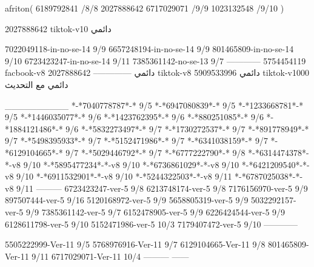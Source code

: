 afriton(
6189792841 /8/8
2027888642
6717029071 /9/9
1023132548 /9/10
)

2027888642 tiktok-v10
دائمي

7022049118-in-no-se-14 9/9
6657248194-in-no-se-14 9/9
801465809-in-no-se-14 9/10
6723423247-in-no-se-14 9/11
7385361142-no-se-13
9/7
------------
5754454119 facbook-v8
دائمي
--------------
2027888642 tiktok-v8
دائمي
5909533996 tiktok-v1000
دائمي مع التحديث

__________
*-*7040778787*-* 9/5
*-*6947080839*-* 9/5
*-*1233668781*-* 9/5
*-*1446035077*-* 9/6
*-*1423762395*-* 9/6
*-*880251085*-* 9/6
*-*1884121486*-* 9/6
*-*5832273497*-* 9/7
*-*1730272537*-* 9/7
*-*891778949*-* 9/7
*-*5498395933*-* 9/7
*-*5152471986*-* 9/7
*-*6341038159*-* 9/7
*-*6129104665*-* 9/7
*-*5029446792*-* 9/7
*-*6777222790*-* 9/8
*-*6314474378*-*-v8 9/10
*-*5895477234*-*-v8 9/10
*-*6736861029*-*-v8 9/10
*-*6421209540*-*-v8 9/10
*-*6911532901*-*-v8 9/10
*-*5244322503*-*-v8 9/11
*-*6787025038*-*-v8 9/11
---------
6723423247-ver-5 9/8
6213748174-ver-5 9/8
7176156970-ver-5 9/9
897507444-ver-5 9/16
5120168972-ver-5 9/9
5658805319-ver-5 9/9
5032292157-ver-5 9/9
7385361142-ver-5 9/7
6152478905-ver-5 9/9
6226424544-ver-5 9/9
6128611798-ver-5 9/10
5152471986-ver-5 10/3
7179407472-ver-5 9/10
------------

5505222999-Ver-11
9/5
5768976916-Ver-11
9/7
6129104665-Ver-11
9/8
801465809-Ver-11
9/11
6717029071-Ver-11
10/4
---------
------
